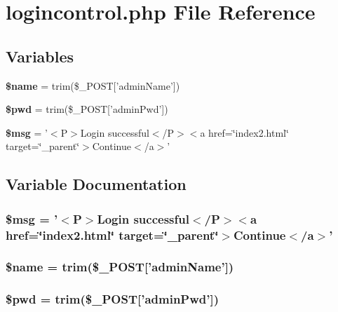 \section{logincontrol.php File Reference}
\label{logincontrol_8php}


\subsection*{Variables}
\begin{CompactItemize}
\item 
{\bf \$name} = trim(\$\_\-POST['admin\-Name'])
\item 
{\bf \$pwd} = trim(\$\_\-POST['admin\-Pwd'])
\item 
{\bf \$msg} = '$<$P$>$Login successful$<$/P$>$$<$a href=\char`\"{}index2.html\char`\"{} target=\char`\"{}\_\-parent\char`\"{}$>$Continue$<$/a$>$'
\end{CompactItemize}


\subsection{Variable Documentation}
\subsubsection{\setlength{\rightskip}{0pt plus 5cm}\$msg = '$<$P$>$Login successful$<$/P$>$$<$a href=\char`\"{}index2.html\char`\"{} target=\char`\"{}\_\-parent\char`\"{}$>$Continue$<$/a$>$'}\label{logincontrol_8php_9e168f4152c267835864153c54449583}


\subsubsection{\setlength{\rightskip}{0pt plus 5cm}\$name = trim(\$\_\-POST['admin\-Name'])}\label{logincontrol_8php_b2fc40d43824ea3e1ce5d86dee0d763b}


\subsubsection{\setlength{\rightskip}{0pt plus 5cm}\$pwd = trim(\$\_\-POST['admin\-Pwd'])}\label{logincontrol_8php_12e4252e778952d356721bc655cff8c8}


